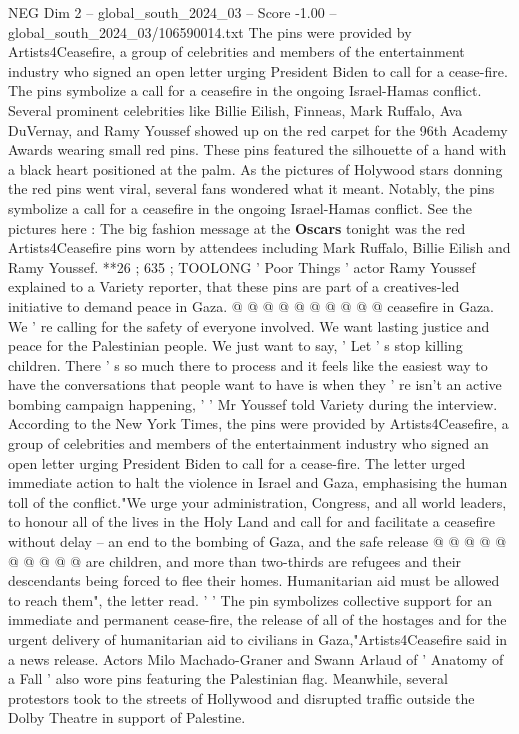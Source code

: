 \begin{textsample}{NEG Dim 2 – global\_south\_2024\_03 – Score -1.00 – global\_south\_2024\_03/106590014.txt}  \label{ex:f2_neg_104}
The pins were provided by Artists4Ceasefire, a group of celebrities and members of the entertainment industry who signed an open letter urging President Biden to call for a cease-fire.
The pins symbolize a call for a ceasefire in the ongoing Israel-Hamas conflict.
Several prominent celebrities like Billie Eilish, Finneas, Mark Ruffalo, Ava DuVernay, and Ramy Youssef showed up on the red carpet for the 96th Academy Awards wearing small red pins.
These pins featured the silhouette of a hand with a black heart positioned at the palm.
As the pictures of Holywood stars donning the red pins went viral, several fans wondered what it meant.
Notably, the pins symbolize a call for a ceasefire in the ongoing Israel-Hamas conflict.
See the pictures here : The big fashion message at the \textbf{Oscars} tonight was the red Artists4Ceasefire pins worn by attendees including Mark Ruffalo, Billie Eilish and Ramy Youssef. **26 ; 635 ; TOOLONG ' Poor Things ' actor Ramy Youssef explained to a Variety reporter, that these pins are part of a creatives-led initiative to demand peace in Gaza. @ @ @ @ @ @ @ @ @ @ ceasefire in Gaza.
We ' re calling for the safety of everyone involved.
We want lasting justice and peace for the Palestinian people.
We just want to say, ' Let ' s stop killing children.
There ' s so much there to process and it feels like the easiest way to have the conversations that people want to have is when they ' re isn't an active bombing campaign happening, ' ' Mr Youssef told Variety during the interview.
According to the New York Times, the pins were provided by Artists4Ceasefire, a group of celebrities and members of the entertainment industry who signed an open letter urging President Biden to call for a cease-fire.
The letter urged immediate action to halt the violence in Israel and Gaza, emphasising the human toll of the conflict."We urge your administration, Congress, and all world leaders, to honour all of the lives in the Holy Land and call for and facilitate a ceasefire without delay -- an end to the bombing of Gaza, and the safe release @ @ @ @ @ @ @ @ @ @ are children, and more than two-thirds are refugees and their descendants being forced to flee their homes.
Humanitarian aid must be allowed to reach them", the letter read. ' ' The pin symbolizes collective support for an immediate and permanent cease-fire, the release of all of the hostages and for the urgent delivery of humanitarian aid to civilians in Gaza,"Artists4Ceasefire said in a news release.
Actors Milo Machado-Graner and Swann Arlaud of ' Anatomy of a Fall ' also wore pins featuring the Palestinian flag.
Meanwhile, several protestors took to the streets of Hollywood and disrupted traffic outside the Dolby Theatre in support of Palestine.

\end{textsample}
